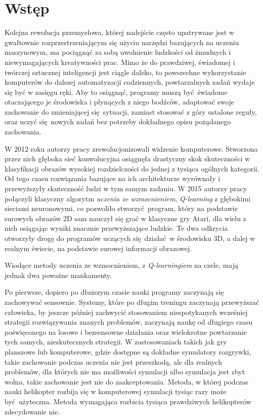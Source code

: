 \chapter{Wstęp}

Kolejna rewolucja przemysłowa, której nadejście często upatrywane jest w gwałtownie rozprzestrzeniającym się użyciu narzędzi bazujących na uczeniu maszynowym, ma pociągnąć za sobą uwolnienie ludzkości od żmudnych i niewymagających kreatywności prac. Mimo że do prawdziwej, świadomej i twórczej sztucznej inteligencji jest ciągle daleko, to powszechne wykorzystanie komputerów do dalszej automatyzacji codziennych, powtarzalnych zadań wydaje się być w zasięgu ręki. Aby to osiągnąć, programy muszą być świadome otaczającego je środowiska i płynących z niego bodźców, adaptować swoje zachowanie do zmieniającej się sytuacji, zamiast stosować z góry ustalone reguły, oraz uczyć się nowych zadań bez potrzeby dokładnego opisu pożądanego zachowania. 

W 2012 roku autorzy pracy \cite{NIPS2012_4824} zrewolucjonizowali widzenie komputerowe. Stworzona przez nich głęboka sieć konwolucyjna osiągnęła drastyczny skok skuteczności w klasyfikacji obrazów wysokiej rozdzielczości do jednej z tysiąca ogólnych kategorii. Od tego czasu rozwiązania bazujące na ich architekturze wyrównały i przewyższyły skuteczność ludzi w tym samym zadaniu. W 2015 autorzy pracy \cite{mnih2015human} połączyli klasyczny algorytm \textit{uczenia ze wzmocnieniem}, \textit{Q-learning} z głębokimi sieciami neuronowymi, co pozwoliło stworzyć program, który na podstawie surowych obrazów 2D sam nauczył się grać w klasyczne gry Atari, dla wielu z nich osiągając wyniki znacznie przewyższające ludzkie. Te dwa odkrycia otworzyły drogę do programów uczących się działać w środowisku 3D, a dalej w realnym świecie, na podstawie surowej informacji obrazowej.

Wiodące metody uczenia ze wzmocnieniem, z \textit{Q-learningiem} na czele, mają jednak dwa poważne mankamenty.

Po pierwsze, dopiero po dłuższym czasie nauki programy zaczynają się zachowywać sensownie. Systemy, które po długim treningu zaczynają przewyższać człowieka, by jeszcze później zachwycić stosowaniem niespotykanych wcześniej strategii rozwiązywania znanych problemów, zaczynają naukę od długiego czasu poświęconego na losowe i bezsensowne działania oraz wielokrotne powtarzanie tych samych, nieskutecznych strategii. W zastosowaniach takich jak gry planszowe lub komputerowe, gdzie dostępne są dokładne symulatory rozgrywki, takie zachowanie podczas uczenia nie jest przeszkodą, ale dla realnych problemów, dla których nie ma możliwości symulacji albo symulacja jest zbyt wolna, takie zachowanie jest nie do zaakceptowania. Metoda, w której podczas nauki helikopter rozbija się w komputerowej symulacji tysiąc razy może być użyteczna. Metoda wymagająca rozbicia tysiąca prawdziwych helikopterów zdecydowanie nie.

